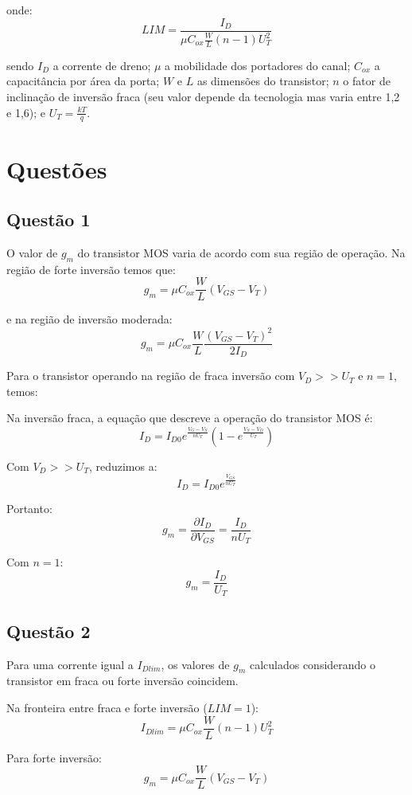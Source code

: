 \documentclass[12pt,a4paper]{article}
\begin{document}
onde:
$$LIM = \frac{I_D}{\mu C_{ox} \frac{W}{L} (n-1) U_T^2}$$

sendo $I_D$ a corrente de dreno; $\mu$ a mobilidade dos portadores do canal; $C_{ox}$ a capacitância por área da porta; $W$ e $L$ as dimensões do transistor; $n$ o fator de inclinação de inversão fraca (seu valor depende da tecnologia mas varia entre 1,2 e 1,6); e $U_T = \frac{kT}{q}$.

\newpage

\section*{Questões}

\subsection*{Questão 1}

O valor de $g_m$ do transistor MOS varia de acordo com sua região de operação. Na região de forte inversão temos que:
$$g_m = \mu C_{ox} \frac{W}{L} (V_{GS} - V_T)$$

e na região de inversão moderada:
$$g_m = \mu C_{ox} \frac{W}{L} \frac{(V_{GS} - V_T)^2}{2I_D}$$

Para o transistor operando na região de fraca inversão com $V_D >> U_T$ e $n = 1$, temos:

Na inversão fraca, a equação que descreve a operação do transistor MOS é:
$$I_D = I_{D0} e^{\frac{V_G - V_S}{nU_T}} \left(1 - e^{\frac{V_S - V_D}{U_T}}\right)$$

Com $V_D >> U_T$, reduzimos a:
$$I_D = I_{D0} e^{\frac{V_{GS}}{nU_T}}$$

Portanto:
$$g_m = \frac{\partial I_D}{\partial V_{GS}} = \frac{I_D}{nU_T}$$

Com $n = 1$:
$$g_m = \frac{I_D}{U_T}$$

\subsection*{Questão 2}

Para uma corrente igual a $I_{Dlim}$, os valores de $g_m$ calculados considerando o transistor em fraca ou forte inversão coincidem.

Na fronteira entre fraca e forte inversão ($LIM = 1$):
$$I_{Dlim} = \mu C_{ox} \frac{W}{L} (n-1) U_T^2$$

Para forte inversão:
$$g_m = \mu C_{ox} \frac{W}{L} (V_{GS} - V_T)$$
\end{document}
